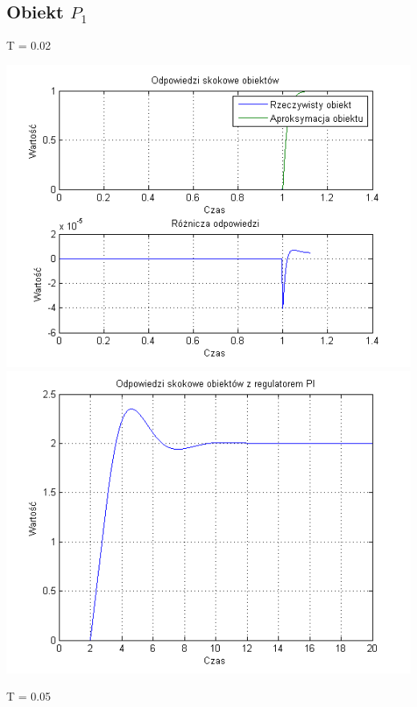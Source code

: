 \documentclass[10pt,a4paper]{article}
\begin{document}
\subsection{Obiekt $P_1$}
T = 0.02
\begin{center}
\includegraphics[scale=1]{images/jeden/skrypt_01.png}\\
\includegraphics[scale=1]{images/jeden/skrypt_02.png}\\
\end{center}
\newpage
T = 0.05
\end{document}
